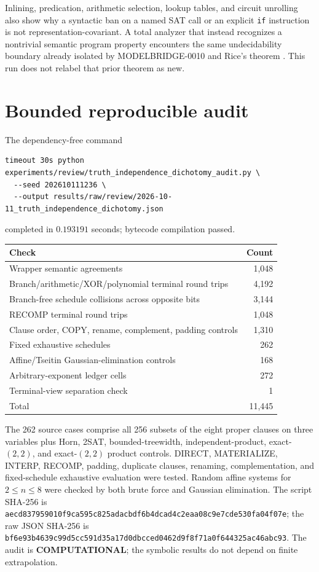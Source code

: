 \documentclass[11pt]{article}
\newcommand{\COMP}{\textbf{COMPUTATIONAL}}
\begin{document}
Inlining, predication, arithmetic selection, lookup tables, and circuit
unrolling also show why a syntactic ban on a named SAT call or an explicit
\texttt{if} instruction is not representation-covariant.  A total analyzer
that instead recognizes a nontrivial semantic program property encounters
the same undecidability boundary already isolated by MODELBRIDGE-0010 and
Rice's theorem \cite{rice}.  This run does not relabel that prior theorem as
new.

\section{Bounded reproducible audit}

The dependency-free command
\begin{verbatim}
timeout 30s python experiments/review/truth_independence_dichotomy_audit.py \
  --seed 202610111236 \
  --output results/raw/review/2026-10-11_truth_independence_dichotomy.json
\end{verbatim}
completed in $0.193191$ seconds; bytecode compilation passed.

\begin{center}
\begin{tabular}{lr}
\toprule
Check & Count\\
\midrule
Wrapper semantic agreements & 1,048\\
Branch/arithmetic/XOR/polynomial terminal round trips & 4,192\\
Branch-free schedule collisions across opposite bits & 3,144\\
RECOMP terminal round trips & 1,048\\
Clause order, COPY, rename, complement, padding controls & 1,310\\
Fixed exhaustive schedules & 262\\
Affine/Tseitin Gaussian-elimination controls & 168\\
Arbitrary-exponent ledger cells & 272\\
Terminal-view separation check & 1\\
\midrule
Total & 11,445\\
\bottomrule
\end{tabular}
\end{center}

The 262 source cases comprise all 256 subsets of the eight proper clauses on
three variables plus Horn, 2SAT, bounded-treewidth, independent-product,
exact-$(2,2)$, and exact-$(2,2)$ product controls.  DIRECT, MATERIALIZE,
INTERP, RECOMP, padding, duplicate clauses, renaming, complementation, and
fixed-schedule exhaustive evaluation were tested.  Random affine systems for
$2\le n\le8$ were checked by both brute force and Gaussian elimination.
The script SHA-256 is
\nolinkurl{aecd837959010f9ca595c825adacbdf6b4dcad4c2eaa08c9e7cde530fa04f07e};
the raw JSON SHA-256 is
\nolinkurl{bf6e93b4639c99d5cc591d35a17d0dbcced0462d9f8f71a0f644325ac46abc93}.
The audit is \COMP; the symbolic results do not depend on finite extrapolation.
\end{document}
